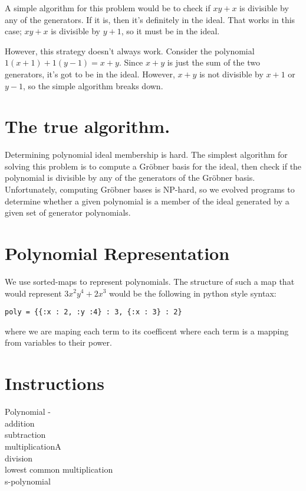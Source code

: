 \documentclass{article}
\begin{document}
    A simple algorithm for this problem would be to check if $xy+x$ is divisible by any of the generators.
    If it is, then it's definitely in the ideal.
    That works in this case; $xy + x$ is divisible by $y+1$, so it must be in the ideal.

    However, this strategy doesn't always work.
    Consider the polynomial $1(x+1) + 1(y-1) = x + y$.
    Since $x+y$ is just the sum of the two generators, it's got to be in the ideal.
    However, $x + y$ is not divisible by $x+1$ or $y-1$, so the simple algorithm breaks down.

\newpage
\section*{The true algorithm.}

    Determining polynomial ideal membership is hard.
    The simplest algorithm for solving this problem is to compute a Gr\"obner basis for the ideal, then check if the polynomial is divisible by any of the generators of the Gr\"obner basis.
    Unfortunately, computing Gr\"obner bases is NP-hard, so we evolved programs to determine whether a given polynomial is a member of the ideal generated by a given set of generator polynomials.


\newpage
\section*{Polynomial Representation}

We use sorted-maps to represent polynomials. The structure of such a map that would represent $3x^2y^4 + 2x^3$ would be the following in python style syntax:

\begin{verbatim}
poly = {{:x : 2, :y :4} : 3, {:x : 3} : 2}
\end{verbatim}

 where we are maping each term to its coefficent where each term is a mapping from variables to their power.


\section*{Instructions}

Polynomial - \\
\indent addition \\
\indent subtraction     \\   
\indent multiplicationA \\
\indent division \\
\indent lowest common multiplication \\
\indent s-polynomial \\
\end{document}
